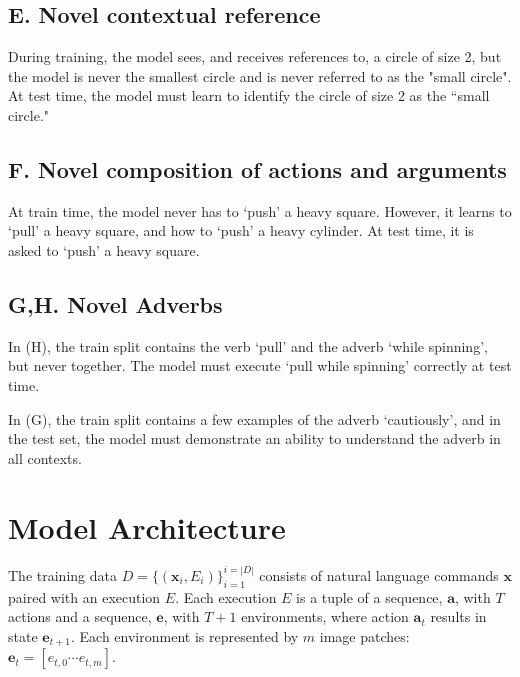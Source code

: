 \documentclass[11pt]{article}
\begin{document}
\subsection*{E. Novel contextual reference}
During training, the model sees, and receives references to, a circle of size 2, but the model is never the smallest circle and is never referred to as the "small circle".
%
At test time, the model must learn to identify the circle of size 2 as the ``small circle."

\subsection*{F. Novel composition of actions and arguments}
At train time, the model never has to `push' a heavy square.
%
However, it learns to `pull' a heavy square, and how to `push' a heavy cylinder.
%
At test time, it is asked to `push' a heavy square.

\subsection*{G,H. Novel Adverbs}
In (H), the train split contains the verb `pull' and the adverb `while spinning', but never together. 
%
The model must execute `pull while spinning' correctly at test time. 

In (G), the train split contains a few examples of the adverb `cautiously', and in the test set, the model must demonstrate an ability to understand the adverb in all contexts.

\section{Model Architecture}
The training data $D=\{(\mathbf{x}_i, E_i) \}_{i=1}^{i=|D|}$ consists of natural language commands $\mathbf{x}$ paired with an execution $E$. 
%
Each execution $E$ is a tuple of a sequence, $\mathbf{a}$, with $T$ actions and a sequence, $\mathbf{e}$, with $T+1$ environments, where action $\mathbf{a}_t$ results in state  $\mathbf{e}_{t+1}$. 
%
Each environment is represented by $m$ image patches: $\mathbf{e}_{t} = [e_{t,0}\cdots e_{t,m}]$.
%
\end{document}
